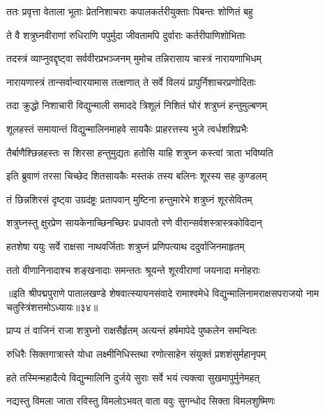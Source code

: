 \twolineshloka
{ततः प्रवृत्ता वेताला भूताः प्रेतनिशाचराः}
{कपालकर्तरीयुक्ताः पिबन्तः शोणितं बहु}%

\twolineshloka
{ते वै शत्रुघ्नवीराणां रुधिराणि पपुर्मुदा}
{जीवतामपि दुर्वाराः कर्तरीपाणिशोभिताः}%

\twolineshloka
{तदस्त्रं व्याप्नुवद्दृष्ट्वा सर्ववीरप्रभञ्जनम्}
{मुमोच तन्निरासाय चास्त्रं नारायणाभिधम्}%

\twolineshloka
{नारायणास्त्रं तान्सर्वान्वारयामास तत्क्षणात्}
{ते सर्वे विलयं प्रापुर्निशाचरप्रणोदिताः}%

\twolineshloka
{तदा क्रुद्धो निशाचारी विद्युन्माली समाददे}
{त्रिशूलं निशितं घोरं शत्रुघ्नं हन्तुमुल्बणम्}%

\twolineshloka
{शूलहस्तं समायान्तं विद्युन्मालिनमाहवे}
{सायकैः प्राहरत्तस्य भुजे त्वर्धशशिप्रभैः}%

\twolineshloka
{तैर्बाणैश्छिन्नहस्तः स शिरसा हन्तुमुद्यतः}
{हतोसि याहि शत्रुघ्न कस्त्वां त्राता भविष्यति}%

\twolineshloka
{इति ब्रुवाणं तरसा चिच्छेद शितसायकैः}
{मस्तकं तस्य बलिनः शूरस्य सह कुण्डलम्}%

\twolineshloka
{तं छिन्नशिरसं दृष्ट्वा उग्रदंष्ट्रः प्रतापवान्}
{मुष्टिना हन्तुमारेभे शत्रुघ्नं शूरसेवितम्}%

\twolineshloka
{शत्रुघ्नस्तु क्षुरप्रेण सायकेनाच्छिनच्छिरः}
{प्रधावतो रणे वीरान्सर्वशस्त्रास्त्रकोविदान्}%

\twolineshloka
{हतशेषा ययुः सर्वे राक्षसा नाथवर्जिताः}
{शत्रुघ्नं प्रणिपत्याथ ददुर्वाजिनमाहृतम्}%

\twolineshloka
{ततो वीणानिनादाश्च शङ्खनादाः समन्ततः}
{श्रूयन्ते शूरवीराणां जयनादा मनोहराः}%

{॥इति श्रीपद्मपुराणे पातालखण्डे शेषवात्स्यायनसंवादे रामाश्वमेधे विद्युन्मालिनामराक्षसपराजयो नाम चतुस्त्रिंशत्तमोऽध्यायः॥३४॥}



\twolineshloka
{प्राप्य तं वाजिनं राजा शत्रुघ्नो राक्षसैर्हृतम्}
{अत्यन्तं हर्षमापेदे पुष्कलेन समन्वितः}%

\twolineshloka
{रुधिरैः सिक्तगात्रास्ते योधा लक्ष्मीनिधिस्तथा}
{रणोत्साहेन संयुक्तं प्रशशंसुर्महानृपम्}%

\twolineshloka
{हते तस्मिन्महादैत्ये विद्युन्मालिनि दुर्जये}
{सुराः सर्वे भयं त्यक्त्वा सुखमापुर्मुनेमहत्}%

\twolineshloka
{नद्यस्तु विमला जाता रविस्तु विमलोऽभवत्}
{वाता ववुः सुगन्धोद सिक्ता विमलशुष्मिणः}%

